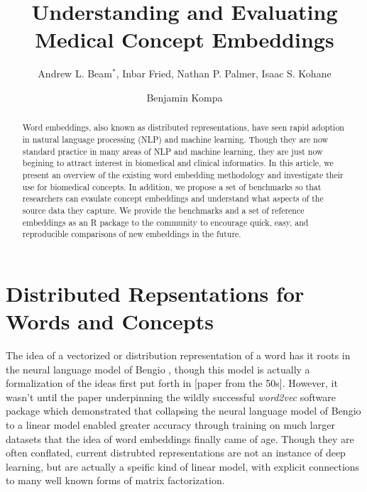 \documentclass{ws-procs11x85}
\begin{document}
\title{Understanding and Evaluating Medical Concept Embeddings}

\author{Andrew L. Beam$^*$, Inbar Fried, Nathan P. Palmer, Isaac S. Kohane}

\address{Department of Biomedical Informatics, Harvard Medical School,\\
Boston, MA, 02115, USA\\
$^*$E-mail: Andrew\_Beam@hms.harvard.edu\\}

\author{Benjamin Kompa}

\address{University of North Carolina, Chapel Hill,\\
Chapel Hill, NC, 27514, USA\\
E-mail: kompa@live.unc.edu}

\begin{abstract}
Word embeddings, also known as distributed representations, have seen rapid adoption in natural language processing (NLP) and machine learning. Though they are now standard practice in many areas of NLP and machine learning, they are just now begining to attract interest in biomedical and clinical informatics. In this article, we present an overview of the existing word embedding methodology and investigate their use for biomedical concepts. In addition, we propose a set of benchmarks so that researchers can evaulate concept embeddings and understand what aspects of the source data they capture. We provide the benchmarks and a set of reference embeddings as an R package to the community to encourage quick, easy, and reproducible comparisons of new embeddings in the future.
\end{abstract}


\bodymatter


\section{Distributed Repsentations for Words and Concepts}\label{aba:intro}
The idea of a vectorized or distribution representation of a word has it roots in the neural language model of Bengio \cite{bengio2003neural}, though this model is actually a formalization of the ideas first put forth in [paper from the 50s]. However, it wasn't until the paper\cite{mikolov2013distributed} underpinning the wildly successful \emph{word2vec} software package which demonstrated that collapsing the neural language model of Bengio\cite{bengio2003neural} to a linear model enabled greater accuracy through training on much larger datasets that the idea of word embeddings finally came of age. Though they are often conflated, current distrubted representations are not an instance of deep learning, but are actually a speific kind of linear model, with explicit connections to many well known forms of matrix factorization.\cite{levy2014neural}
\end{document}
